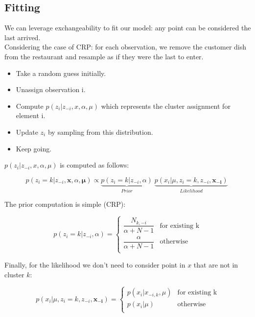 \documentclass[twoside]{article}
\begin{document}
\subsection{Fitting}
We can leverage exchangeability to fit our model: any point can be considered the last arrived.\\ Considering the case of CRP: for	each	observation, we	remove	the	customer dish from	the	restaurant	and	resample	as	if	they	were	the	last	to	enter.

\begin{itemize}
    \item Take a random guess initially.
    \item Unassign observation i.
    \item Compute $p(z_{i} | z_{-i}, x, \alpha, \mu)$ which  represents the cluster assignment for element i.
    \item Update $z_{i}$ by sampling from this distribution.
    \item Keep going.
    
\end{itemize}

$p(z_{i} | z_{-i}, x, \alpha, \mu)$ is computed as follows:

$$p(z_{i}=k | z_{-i}, \mathbf{x}, \alpha, \mathbf{\mu}) \propto \underbrace{p(z_{i}=k | z_{-i}, \alpha)}_{Prior} \; \underbrace{p(x_{i}| \mu, z_{i}=k, z_{-i}, \mathbf{x_{-i}})}_{Likelihood} \;$$


The prior computation is simple (CRP):


\[
  p(z_{i}=k | z_{-i}, \alpha)=
  \begin{cases}
                                  \dfrac{N_{k,-i}}{\alpha+N-1} & \text{for existing k} \\
                                   \dfrac{\alpha}{\alpha +N-1} & \text{otherwise} \\
  \end{cases}
\]

Finally, for the likelihood we don't need to consider point in $x$ that are not in cluster $k$:

\[
  p(x_{i}| \mu, z_{i}=k, z_{-i}, \mathbf{x_{-i}})=
  \begin{cases}
                                  p(x_{i} | x_{-i,k}, \mu) & \text{for existing k} \\
                                   p(x_{i} | \mu) & \text{otherwise} \\
  \end{cases}
\]
\end{document}
